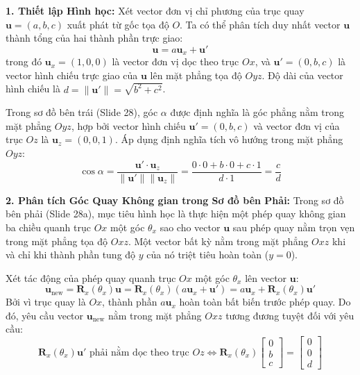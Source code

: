 \textbf{1. Thiết lập Hình học:}
Xét vector đơn vị chỉ phương của trục quay $\mathbf{u} = (a, b, c)$ xuất phát từ gốc tọa độ $O$. Ta có thể phân tích duy nhất vector $\mathbf{u}$ thành tổng của hai thành phần trực giao:
\begin{equation}
\mathbf{u} = a \mathbf{u}_x + \mathbf{u}'
\end{equation}
trong đó $\mathbf{u}_x = (1, 0, 0)$ là vector đơn vị dọc theo trục $Ox$, và $\mathbf{u}' = (0, b, c)$ là vector hình chiếu trực giao của $\mathbf{u}$ lên mặt phẳng tọa độ $Oyz$. Độ dài của vector hình chiếu là $d = \|\mathbf{u}'\| = \sqrt{b^2 + c^2}$.

Trong sơ đồ bên trái (Slide 28), góc $\alpha$ được định nghĩa là góc phẳng nằm trong mặt phẳng $Oyz$, hợp bởi vector hình chiếu $\mathbf{u}' = (0, b, c)$ và vector đơn vị của trục $Oz$ là $\mathbf{u}_z = (0, 0, 1)$. Áp dụng định nghĩa tích vô hướng trong mặt phẳng $Oyz$:
\begin{equation}
\label{eq:proof_alpha_dot}
\cos\alpha = \frac{\mathbf{u}' \cdot \mathbf{u}_z}{\|\mathbf{u}'\| \|\mathbf{u}_z\|} = \frac{0 \cdot 0 + b \cdot 0 + c \cdot 1}{d \cdot 1} = \frac{c}{d}
\end{equation}

\textbf{2. Phân tích Góc Quay Không gian trong Sơ đồ bên Phải:}
Trong sơ đồ bên phải (Slide 28a), mục tiêu hình học là thực hiện một phép quay không gian ba chiều quanh trục $Ox$ một góc $\theta_x$ sao cho vector $\mathbf{u}$ sau phép quay nằm trọn vẹn trong mặt phẳng tọa độ $Oxz$.
Một vector bất kỳ nằm trong mặt phẳng $Oxz$ khi và chỉ khi thành phần tung độ $y$ của nó triệt tiêu hoàn toàn ($y = 0$).

Xét tác động của phép quay quanh trục $Ox$ một góc $\theta_x$ lên vector $\mathbf{u}$:
\begin{equation}
\mathbf{u}_{\text{new}} = \mathbf{R}_x(\theta_x) \mathbf{u} = \mathbf{R}_x(\theta_x) \left( a \mathbf{u}_x + \mathbf{u}' \right) = a \mathbf{u}_x + \mathbf{R}_x(\theta_x) \mathbf{u}'
\end{equation}
Bởi vì trục quay là $Ox$, thành phần $a \mathbf{u}_x$ hoàn toàn bất biến trước phép quay. Do đó, yêu cầu vector $\mathbf{u}_{\text{new}}$ nằm trong mặt phẳng $Oxz$ tương đương tuyệt đối với yêu cầu:
\begin{equation}
\mathbf{R}_x(\theta_x) \mathbf{u}' \text{ phải nằm dọc theo trục } Oz \iff \mathbf{R}_x(\theta_x) \begin{bmatrix} 0 \\ b \\ c \end{bmatrix} = \begin{bmatrix} 0 \\ 0 \\ d \end{bmatrix}
\end{equation}


